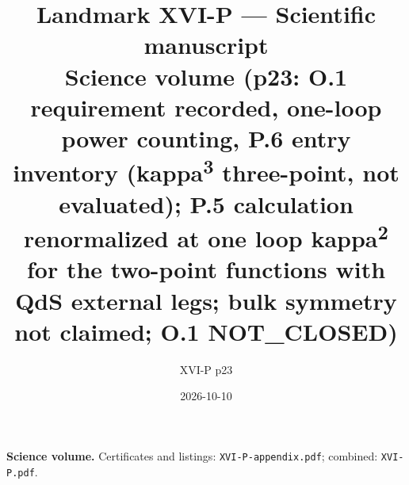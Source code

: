 \documentclass{article}
\title{Landmark XVI-P --- Scientific manuscript\\
\large Science volume (p23: O.1 requirement recorded, one-loop power counting, P.6 entry inventory (kappa\textsuperscript{3} three-point, not evaluated); P.5 calculation renormalized at one loop kappa\textsuperscript{2} for the two-point functions with QdS external legs; bulk symmetry not claimed; O.1 NOT\_CLOSED)}
\author{XVI-P p23}
\date{2026-10-10}
\begin{document}
\maketitle
\noindent\textbf{Science volume.} Certificates and listings: \texttt{XVI-P-appendix.pdf}; combined: \texttt{XVI-P.pdf}.

\tableofcontents
\newpage

\end{document}
